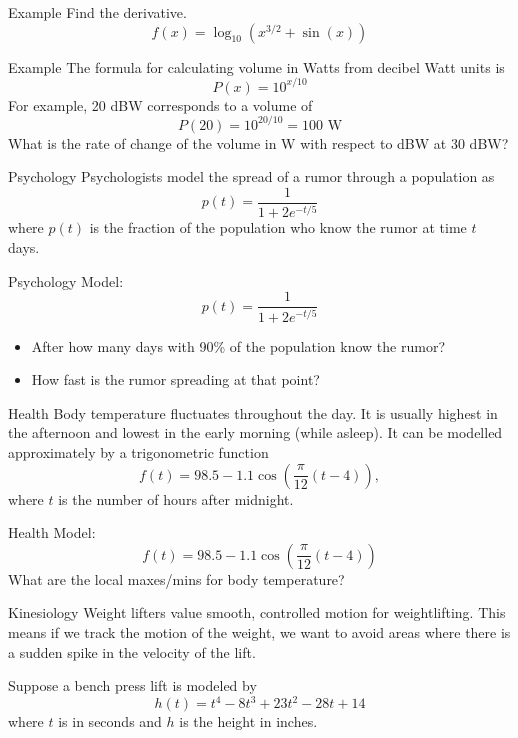 \documentclass[t]{beamer}
\begin{document}
\begin{frame}{Example}
Find the derivative.
$$f(x) = \log_{10}(x^{3/2} + \sin(x))$$
\end{frame}

\begin{frame}{Example}
The formula for calculating volume in Watts from decibel Watt units is
$$P(x) = 10^{x/10}$$
For example,  20 dBW corresponds to a volume of
$$P(20) = 10^{20/10} = 100 \text{ W}$$
What is the rate of change of the volume in W with respect to dBW at 30 dBW?
\end{frame}


\begin{frame}{Psychology}
Psychologists model the spread of a rumor through a population as
$$p(t) = \frac{1}{1 + 2e^{-t/5}}$$
where $p(t)$ is the fraction of the population who know the rumor at time $t$ days.
\end{frame}

\begin{frame}{Psychology}
Model: 
$$p(t) = \frac{1}{1 + 2e^{-t/5}}$$
\begin{itemize}
\item After how many days with 90\% of the population know the
rumor?
\item How fast is the rumor spreading at that point?
\end{itemize}
\end{frame}

\begin{frame}{Health}
Body temperature fluctuates throughout the day. It
is usually highest in the afternoon and lowest in the
early morning (while asleep). It can be modelled
approximately by a trigonometric function
$$ f(t) = 98.5 - 1.1 \cos\left( \frac{\pi}{12}(t-4)\right), $$
where $t$ is the number of hours after midnight.
\end{frame}

\begin{frame}{Health}
Model:
$$ f(t) = 98.5 - 1.1 \cos\left( \frac{\pi}{12}(t-4)\right) $$
What are the local maxes/mins for body temperature?
\end{frame}

\begin{frame}{Kinesiology}
Weight lifters value smooth, controlled motion for
weightlifting. This means if we track the motion of
the weight, we want to avoid areas where there is a
sudden spike in the velocity of the lift.

Suppose a bench press lift is modeled by
$$h(t) = t^4 - 8t^3 + 23t^2 -28t + 14$$
where $t$ is in seconds and $h$ is the height in inches.
\end{frame}
\end{document}
